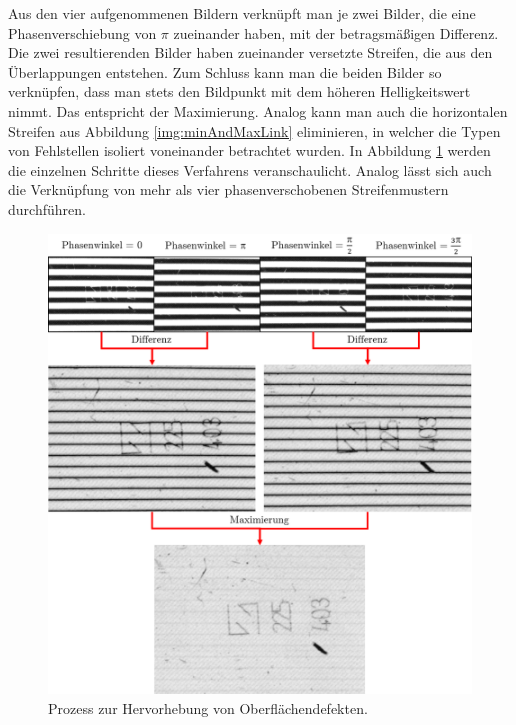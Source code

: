 Aus den vier aufgenommenen Bildern verknüpft man je zwei Bilder, die eine Phasenverschiebung von $\pi$ zueinander haben, mit der betragsmäßigen Differenz.
Die zwei resultierenden Bilder haben zueinander versetzte Streifen, die aus den Überlappungen entstehen.
Zum Schluss kann man die beiden Bilder so verknüpfen, dass man stets den Bildpunkt mit dem höheren Helligkeitswert nimmt.
Das entspricht der Maximierung.
Analog kann man auch die horizontalen Streifen aus Abbildung \ref{img:minAndMaxLink} eliminieren, in welcher die Typen von Fehlstellen isoliert voneinander betrachtet wurden.
In Abbildung \ref{img:imageTree} werden die einzelnen Schritte dieses Verfahrens veranschaulicht.
Analog lässt sich auch die Verknüpfung von mehr als vier phasenverschobenen Streifenmustern durchführen.

\begin{figure}[H]
	\centering
	\includegraphics[width=\textwidth]{03_sichtpruefungDurchLichtstreuung/optimierungen/figures/imageTree}
	\caption[Prozess der Hervorhebung von Oberflächendefekten]{Prozess zur Hervorhebung von Oberflächendefekten.}
	\label{img:imageTree}
\end{figure}

